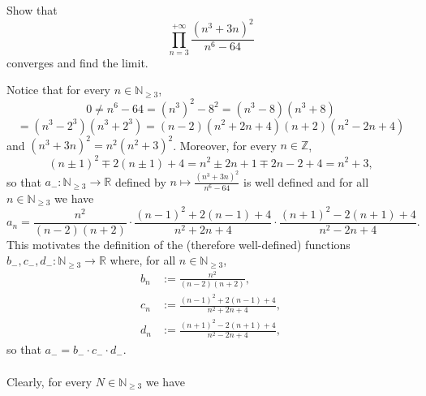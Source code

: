 \begin{problem}
    Show that
    \[
        \prod_{n=3}^{+\infty} \frac{\left(n^3+3n\right)^2}{n^6-64}
    \]
    converges and find the limit.
\end{problem}
\begin{solution}
    Notice that for every \( n \in \mathbb{N}_{\geq 3} \),
    \[
        0\neq n^6-64 = \left(n^3\right)^2-8^2 = \left(n^3-8\right)\left(n^3+8\right)
    \]
    \[
        = \left(n^3-2^3\right)\left(n^3+2^3\right) = \left(n-2\right)\left(n^2+2n+4\right)\left(n+2\right)\left(n^2-2n+4\right)
    \]
    and \( \left(n^3+3n\right)^2 = n^2\left(n^2+3\right)^2 \). Moreover, for every \( n \in \mathbb{Z} \),
    \[
        \left(n\pm 1\right)^2 \mp 2\left(n\pm 1\right)+4 = n^2 \pm 2n+1 \mp 2n-2+4 = n^2+3,
    \]
    so that \( a_{-}\colon \mathbb{N}_{\geq 3} \to \mathbb{R} \) defined by \( n\mapsto \frac{\left(n^3+3n\right)^2}{n^6-64} \) is well defined and for all \( n \in \mathbb{N}_{\geq 3} \) we have
    \[
        a_n = \frac{n^2}{\left(n-2\right)\left(n+2\right)} \cdot \frac{\left(n-1\right)^2+2\left(n-1\right)+4}{n^2+2n+4} \cdot \frac{\left(n+1\right)^2-2\left(n+1\right)+4}{n^2-2n+4}.
    \]
    This motivates the definition of the (therefore well-defined) functions \( b_{-}, c_{-}, d_{-} \colon \mathbb{N}_{\geq 3} \to \mathbb{R} \) where, for all \( n \in \mathbb{N}_{\geq 3} \),
    \[
        \begin{aligned}
            b_n & := \frac{n^2}{\left(n-2\right)\left(n+2\right)},            \\
            c_n & := \frac{\left(n-1\right)^2+2\left(n-1\right)+4}{n^2+2n+4}, \\
            d_n & := \frac{\left(n+1\right)^2-2\left(n+1\right)+4}{n^2-2n+4},
        \end{aligned}
    \]
    so that \( a_{-} = b_{-} \cdot c_{-} \cdot d_{-} \).
    \\\\
    Clearly, for every \( N \in \mathbb{N}_{\geq 3} \) we have

\end{solution}
